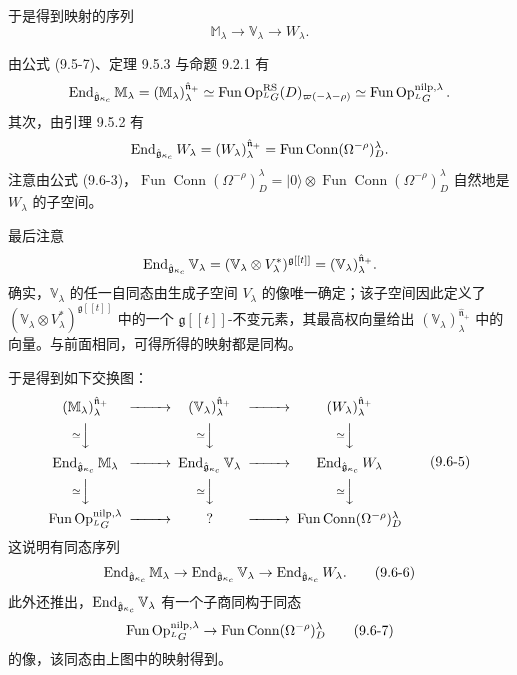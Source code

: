 于是得到映射的序列
\begin{equation}
    \mathbb{M}_\lambda\to\mathbb{V}_\lambda\to W_\lambda .
    \tag{9.6-4}
\end{equation}

由公式 (9.5-7)、定理 9.5.3 与命题 9.2.1 有
\[
    \operatorname{End}_{\hat{\mathfrak{g}}_{\kappa_c}}\mathbb{M}_\lambda
    =(\mathbb{M}_\lambda)^{\hat{\mathfrak{n}}_+}_\lambda
    \simeq\operatorname{Fun}\operatorname{Op}^{\mathrm{RS}}_{{}^LG}(D)_{\varpi(-\lambda-\rho)}
    \simeq\operatorname{Fun}\operatorname{Op}^{\mathrm{nilp},\lambda}_{{}^LG}.
\]
其次，由引理 9.5.2 有
\[
    \operatorname{End}_{\hat{\mathfrak{g}}_{\kappa_c}}W_\lambda
    =(W_\lambda)^{\hat{\mathfrak{n}}_+}_\lambda
    =\operatorname{Fun}\operatorname{Conn}(\Omega^{-\rho})^\lambda_D .
\]
注意由公式 (9.6-3)，$\operatorname{Fun}\operatorname{Conn}(\Omega^{-\rho})^\lambda_D=|0\rangle\otimes\operatorname{Fun}\operatorname{Conn}(\Omega^{-\rho})^\lambda_D$ 自然地是 $W_\lambda$ 的子空间。

最后注意
\[
    \operatorname{End}_{\hat{\mathfrak{g}}_{\kappa_c}}\mathbb{V}_\lambda
    =(\mathbb{V}_\lambda\otimes V_\lambda^*)^{\mathfrak{g}[[t]]}
    =(\mathbb{V}_\lambda)^{\hat{\mathfrak{n}}_+}_\lambda .
\]
确实，$\mathbb{V}_\lambda$ 的任一自同态由生成子空间 $V_\lambda$ 的像唯一确定；该子空间因此定义了 $(\mathbb{V}_\lambda\otimes V_\lambda^*)^{\mathfrak{g}[[t]]}$ 中的一个 $\mathfrak{g}[[t]]$-不变元素，其最高权向量给出 $(\mathbb{V}_\lambda)^{\hat{\mathfrak{n}}_+}_\lambda$ 中的向量。与前面相同，可得所得的映射都是同构。

于是得到如下交换图：
\begin{equation}
    \begin{CD}
        (\mathbb{M}_\lambda)^{\hat{\mathfrak{n}}_+}_\lambda @>>>
            (\mathbb{V}_\lambda)^{\hat{\mathfrak{n}}_+}_\lambda @>>>
            (W_\lambda)^{\hat{\mathfrak{n}}_+}_\lambda\\
        @V{\simeq}VV @V{\simeq}VV @V{\simeq}VV\\
        \operatorname{End}_{\gghat_{\kappa_c}}\mathbb{M}_\lambda @>>>
            \operatorname{End}_{\gghat_{\kappa_c}}\mathbb{V}_\lambda @>>>
            \operatorname{End}_{\gghat_{\kappa_c}}W_\lambda\\
        @V{\simeq}VV @V{\simeq}VV @V{\simeq}VV\\
        \operatorname{Fun}\Op^{\mathrm{nilp},\lambda}_{{}^LG} @>>> ? @>>>
            \operatorname{Fun}\operatorname{Conn}(\Omega^{-\rho})^\lambda_D
    \end{CD}
    \tag{9.6-5}
\end{equation}
这说明有同态序列
\begin{equation}
    \operatorname{End}_{\hat{\mathfrak{g}}_{\kappa_c}}\mathbb{M}_\lambda
    \to\operatorname{End}_{\hat{\mathfrak{g}}_{\kappa_c}}\mathbb{V}_\lambda
    \to\operatorname{End}_{\hat{\mathfrak{g}}_{\kappa_c}}W_\lambda .
    \tag{9.6-6}
\end{equation}
此外还推出，$\operatorname{End}_{\hat{\mathfrak{g}}_{\kappa_c}}\mathbb{V}_\lambda$ 有一个子商同构于同态
\begin{equation}
    \operatorname{Fun}\operatorname{Op}^{\mathrm{nilp},\lambda}_{{}^LG}\to\operatorname{Fun}\operatorname{Conn}(\Omega^{-\rho})^\lambda_D
    \tag{9.6-7}
\end{equation}
的像，该同态由上图中的映射得到。


